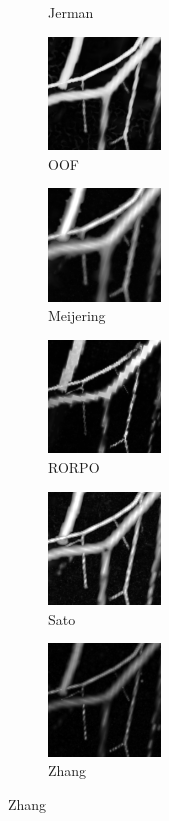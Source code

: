 \begin{figure}[H]
\begin{subfigure}[t]{0.24\textwidth}
      \caption{Jerman}
    \end{subfigure}
    \begin{subfigure}[t]{0.24\textwidth}
      \includegraphics[clip = true, trim  =  170 230 150 240, width=30mm]{Images/Vascu_2_k_OOF_GM.png}
      \caption{OOF}
    \end{subfigure}
    \begin{subfigure}[t]{0.24\textwidth}
      \includegraphics[clip = true,trim  =  170 230 150 240, width=30mm]{Images/Vascu_2_k_Meijering.png}
      \caption{Meijering}
    \end{subfigure}
    \begin{subfigure}[t]{0.24\textwidth}
      \includegraphics[clip = true, trim  =  170 230 150 240, width=30mm]{Images/Vascu_2_k_RORPO.png}
      \caption{RORPO}
    \end{subfigure}
    \begin{subfigure}[t]{0.24\textwidth}
      \includegraphics[clip = true, trim  =  170 230 150 240, width=30mm]{Images/Vascu_2_k_Sato.png}
      \caption{Sato}
    \end{subfigure}
    \begin{subfigure}[t]{0.24\textwidth}
      \includegraphics[clip = true, trim  =  170 230 150 240, width=30mm]{Images/Vascu_2_k_Zhang.png}
      \caption{Zhang}
    \end{subfigure}


\end{figure}
